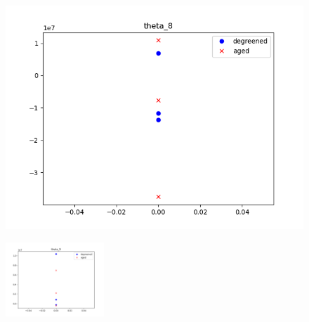 \begin{figure}[H]
\begin{minipage}{0.33\textwidth}
                \includegraphics[width = \textwidth]{./figs/figs_new_mdl/theta_8.png}
        \end{minipage}
\end{figure}

\begin{figure}[H]
        \centering
        \includegraphics[width = 0.33\textwidth]{./figs/figs_new_mdl/theta_9.png}
\end{figure}
